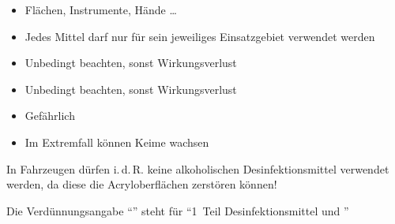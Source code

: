 {}{

\begin{itemize}
  \item Flächen, Instrumente, Hände \ldots{}
  \item Jedes Mittel darf nur für sein jeweiliges
  Einsatzgebiet verwendet  werden
\end{itemize}


\begin{itemize}
  \item Unbedingt beachten, sonst Wirkungsverlust
\end{itemize}


\begin{itemize}
  \item Unbedingt beachten, sonst Wirkungsverlust
\end{itemize}


\begin{itemize}
  \item Gefährlich
  \item Im Extremfall können Keime  wachsen
\end{itemize}
}{}{}{}

\begin{Danger}
  \item In Fahrzeugen dürfen i.\,d.\,R. keine alkoholischen
  Desinfektionsmittel verwendet werden, da diese die
  Acryloberflächen zerstören können!
  \item Die Verdünnungsangabe \enquote{} steht für \enquote{1~Teil
  Desinfektionsmittel und
  }
\end{Danger}

\begin{Synopsis}
\end{Synopsis}

